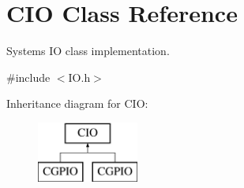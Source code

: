 \hypertarget{class_c_i_o}{}\section{C\+IO Class Reference}
\label{class_c_i_o}


System\textquotesingle{}s IO class implementation.  




{\ttfamily \#include $<$I\+O.\+h$>$}

Inheritance diagram for C\+IO\+:\begin{figure}[H]
\begin{center}
\leavevmode
\includegraphics[height=2.000000cm]{class_c_i_o}
\end{center}
\end{figure}

